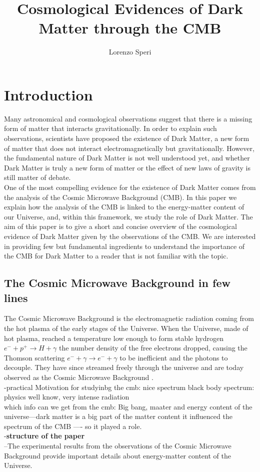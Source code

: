 \documentclass{article}
\title{Cosmological Evidences of Dark Matter through the CMB}
\author{Lorenzo Speri}
\date{}
\begin{document}
\maketitle


\section{Introduction}
Many astronomical and cosmological observations suggest that there is a missing form of matter that interacts gravitationally. 
In order to explain such observations, scientists have proposed the existence of Dark Matter, a new form of matter that does not interact electromagnetically but gravitationally.
However, the fundamental nature of Dark Matter is not well understood yet, and whether Dark Matter is truly a new form of matter or the effect of new laws of gravity is still matter of debate.\\
One of the most compelling evidence for the existence of Dark Matter comes from the analysis of the Cosmic Microwave Background (CMB).
In this paper we explain how the  analysis of the CMB is linked to the energy-matter content of our Universe, and, within this framework, we study the role of Dark Matter.
The aim of this paper is to give a short and concise overview of the cosmological evidence of Dark Matter given by the observations of the CMB.
We are interested in providing few but fundamental ingredients to understand the importance of the CMB for Dark Matter to a reader that is not familiar with the topic.
\\
 

\subsection{The Cosmic Microwave Background in few lines}


The Cosmic Microwave Background is the electromagnetic radiation coming from the hot plasma of the early stages of the Universe.
When the Universe, made of hot plasma, reached a temperature low enough to form stable hydrogen $e^- + p^+  \rightarrow H + \gamma$ the number density of the free electrons dropped, causing the Thomson scattering $e^- + \gamma  \rightarrow e^- + \gamma$ to be inefficient and the photons to decouple. They have since streamed freely through the universe and are today observed as the Cosmic Microwave Background \citep{LecturesPdf}.\\

-practical Motivation for studyinbg the cmb: nice spectrum black body spectrum: physics well know, very intense radiation\\
which info can we get from the cmb: Big bang, maater and energy content of the universe---dark matter is a big part of the matter content it influenced the spectrum  of the CMB ---- so it played a role.\\
-\textbf{structure of the paper} \\
--The experimental results from the observations of the Cosmic Microwave Background provide important details about energy-matter content of the Universe.
\end{document}
